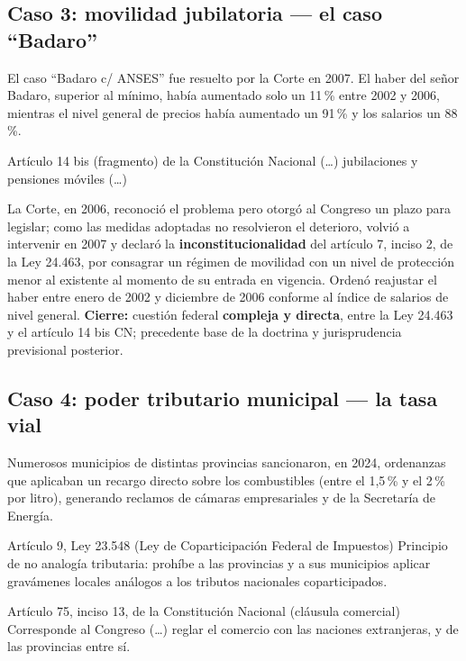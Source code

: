 \documentclass[12pt,oneside]{book}
\begin{document}
\subsection{Caso 3: movilidad jubilatoria --- el caso ``Badaro''}

El caso ``Badaro c/ ANSES'' fue resuelto por la Corte en 2007. El haber del señor Badaro, superior al mínimo, había aumentado solo un 11\,\% entre 2002 y 2006, mientras el nivel general de precios había aumentado un 91\,\% y los salarios un 88\,\%.

\begin{norma}{Artículo 14 bis (fragmento) de la Constitución Nacional}
(\ldots) jubilaciones y pensiones móviles (\ldots)
\end{norma}

La Corte, en 2006, reconoció el problema pero otorgó al Congreso un plazo para legislar; como las medidas adoptadas no resolvieron el deterioro, volvió a intervenir en 2007 y declaró la \textbf{inconstitucionalidad} del artículo 7, inciso 2, de la Ley 24.463, por consagrar un régimen de movilidad con un nivel de protección menor al existente al momento de su entrada en vigencia. Ordenó reajustar el haber entre enero de 2002 y diciembre de 2006 conforme al índice de salarios de nivel general. \textbf{Cierre:} cuestión federal \textbf{compleja y directa}, entre la Ley 24.463 y el artículo 14 bis CN; precedente base de la doctrina y jurisprudencia previsional posterior.

\subsection{Caso 4: poder tributario municipal --- la tasa vial}

Numerosos municipios de distintas provincias sancionaron, en 2024, ordenanzas que aplicaban un recargo directo sobre los combustibles (entre el 1,5\,\% y el 2\,\% por litro), generando reclamos de cámaras empresariales y de la Secretaría de Energía.

\begin{norma}{Artículo 9, Ley 23.548 (Ley de Coparticipación Federal de Impuestos)}
Principio de no analogía tributaria: prohíbe a las provincias y a sus municipios aplicar gravámenes locales análogos a los tributos nacionales coparticipados.
\end{norma}

\begin{norma}{Artículo 75, inciso 13, de la Constitución Nacional (cláusula comercial)}
Corresponde al Congreso (\ldots) reglar el comercio con las naciones extranjeras, y de las provincias entre sí.
\end{norma}
\end{document}
